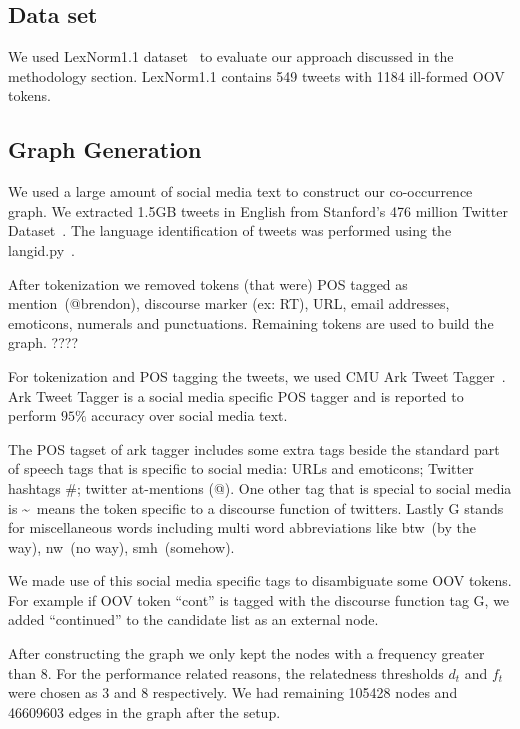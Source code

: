 \documentclass[preprint,review,12pt]{elsarticle}
\begin{document}
\subsection{Data set}
We used LexNorm1.1 dataset~\cite{Han:2011:LNS:2002472.2002520} to evaluate our approach discussed in the methodology section. LexNorm1.1 contains 549 tweets with 1184 ill-formed OOV tokens.

\subsection{Graph Generation}
We used a large amount of social media text to construct our co-occurrence graph. We extracted 1.5GB tweets in English from Stanford's 476 million Twitter Dataset~\cite{DBLP:conf/wsdm/YangL11}. The language identification of tweets was performed using the langid.py~\cite{Lui:2012:LOL:2390470.2390475, Baldwin:2010:LIL:1857999.1858026}.

After tokenization we removed tokens (that were) POS tagged as mention~(@brendon), discourse marker (ex: RT), URL, email addresses, emoticons, numerals and punctuations. Remaining tokens are used to build the graph. ????

For tokenization and POS tagging the tweets, we used CMU Ark Tweet Tagger~\cite{DBLP:conf/naacl/OwoputiODGSS13,Gimpel:2011:PTT:2002736.2002747}. Ark Tweet Tagger is a social media specific POS tagger and is reported to perform $95\%$ accuracy over social media text.

The POS tagset of ark tagger includes some extra tags beside the standard part of speech tags that is specific to social media: URLs and emoticons; Twitter hashtags \#; twitter at-mentions (@). One other tag that is special to social media is \textasciitilde~means the token specific to a discourse function of twitters. Lastly G stands for miscellaneous words including multi word abbreviations like btw~(by the way), nw~(no way), smh~(somehow).

We made use of this social media specific tags to disambiguate some OOV tokens. For example if OOV token ``cont'' is tagged with the discourse function tag G, we added ``continued'' to the candidate list as an external node.

After constructing the graph we only kept the nodes with a frequency greater than 8. For the performance related reasons, the relatedness thresholds $d_t$ and $f_t$  were chosen as 3 and 8 respectively. We had remaining 105428 nodes and 46609603 edges in the graph after the setup.
\end{document}
